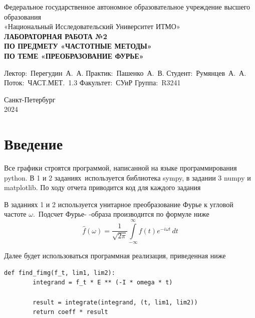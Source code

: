 \documentclass[a4paper, 16pt]{article}
\begin{document}
\begin{titlepage}

    \begin{center}
    \vfill
    
    Федеральное государственное автономное образовательное учреждение высшего образования\\
    «Национальный Исследовательский Университет ИТМО»\ \\
    
    \vfill
    {\large\bf ЛАБОРАТОРНАЯ РАБОТА №2\\
        ПО ПРЕДМЕТУ «ЧАСТОТНЫЕ МЕТОДЫ»\\
        ПО ТЕМЕ «ПРЕОБРАЗОВАНИЕ ФУРЬЕ»}
    \vfill
        
    \begin{flushright}
        \begin{minipage}{.45\textwidth}
        {
            \hbox{Лектор: Перегудин А. А.}
            \hbox{Практик: Пашенко А. В.}
            \hbox{Студент: Румянцев А. А.}
            \hbox{Поток: ЧАСТ.МЕТ. 1.3}
            \hbox{}
            \hbox{Факультет: СУиР}
            \hbox{Группа: R3241}
        }
        \end{minipage}
    \end{flushright}
    
    \vfill
            
    Санкт-Петербург\\
    2024
    \end{center}
    \end{titlepage}
    \setlength{\parskip}{1.5mm}
    
    \tableofcontents

    \newpage
    \section{Введение}
    \noindent Все графики строятся программой, написанной на языке программирования python. В 1 и 2 заданиях\
    используется библиотека sympy, в задании 3 numpy и matplotlib. По ходу отчета приводится код для каждого задания


    \noindent В заданиях 1 и 2 используется унитарное преобразование Фурье к угловой частоте $\omega$.\
    Подсчет Фурье- -образа производится по формуле ниже
    $$
    \hat{f}\left(\omega\right)=\dfrac{1}{\sqrt{2\pi}}\int\limits_{-\infty}^{\infty}f(t)e^{-i\omega t}\,dt
    $$


    \noindent Далее будет использоваться программная реализация, приведенная ниже
    \begin{lstlisting}[label=fw, caption=Программная реализация вычисления Фурье-образа с угловой частотой $\omega$]
    def find_fimg(f_t, lim1, lim2):
        integrand = f_t * E ** (-I * omega * t)

        result = integrate(integrand, (t, lim1, lim2))
        return coeff * result
    \end{lstlisting}    
\end{document}
